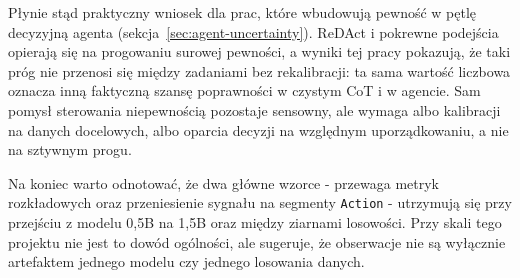 Płynie stąd praktyczny wniosek dla prac, które wbudowują pewność w
pętlę decyzyjną agenta (sekcja~\ref{sec:agent-uncertainty}). ReDAct
\cite{redact2026} i pokrewne podejścia opierają się na progowaniu
surowej pewności, a wyniki tej pracy pokazują, że taki próg nie
przenosi się między zadaniami bez rekalibracji: ta sama wartość
liczbowa oznacza inną faktyczną szansę poprawności w czystym CoT i
w agencie. Sam pomysł sterowania niepewnością pozostaje sensowny,
ale wymaga albo kalibracji na danych docelowych, albo oparcia decyzji
na względnym uporządkowaniu, a nie na sztywnym progu.

Na koniec warto odnotować, że dwa główne wzorce - przewaga metryk
rozkładowych oraz przeniesienie sygnału na segmenty \texttt{Action} -
utrzymują się przy przejściu z modelu 0,5B na 1,5B oraz między
ziarnami losowości. Przy skali tego projektu nie jest to dowód
ogólności, ale sugeruje, że obserwacje nie są wyłącznie artefaktem
jednego modelu czy jednego losowania danych.
